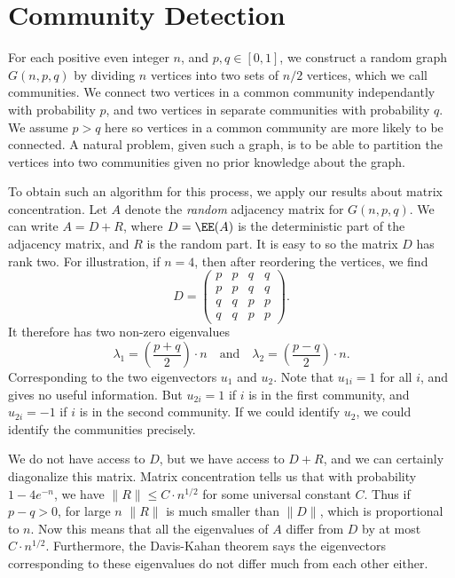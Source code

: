 \section{Community Detection}

For each positive even integer $n$, and $p,q \in [0,1]$, we construct a random graph $G(n,p,q)$ by dividing $n$ vertices into two sets of $n/2$ vertices, which we call communities. We connect two vertices in a common community independantly with probability $p$, and two vertices in separate communities with probability $q$. We assume $p > q$ here so vertices in a common community are more likely to be connected. A natural problem, given such a graph, is to be able to partition the vertices into two communities given no prior knowledge about the graph.

To obtain such an algorithm for this process, we apply our results about matrix concentration. Let $A$ denote the {\it random} adjacency matrix for $G(n,p,q)$. We can write $A = D + R$, where $D = \EE(A)$ is the deterministic part of the adjacency matrix, and $R$ is the random part. It is easy to so the matrix $D$ has rank two. For illustration, if $n = 4$, then after reordering the vertices, we find
%
\[ D = \begin{pmatrix} p & p & q & q \\ p & p & q & q \\ q & q & p & p \\ q & q & p & p \end{pmatrix}. \]
%
It therefore has two non-zero eigenvalues
%
\[ \lambda_1 = \left( \frac{p + q}{2} \right) \cdot n\quad\text{and}\quad \lambda_2 = \left( \frac{p - q}{2} \right) \cdot n. \]
%
Corresponding to the two eigenvectors $u_1$ and $u_2$. Note that $u_{1i} = 1$ for all $i$, and gives no useful information. But $u_{2i} = 1$ if $i$ is in the first community, and $u_{2i} = -1$ if $i$ is in the second community. If we could identify $u_2$, we could identify the communities precisely.

We do not have access to $D$, but we have access to $D + R$, and we can certainly diagonalize this matrix. Matrix concentration tells us that with probability $1 - 4e^{-n}$, we have $\| R \| \leq C \cdot n^{1/2}$ for some universal constant $C$. Thus if $p - q > 0$, for large $n$ $\| R \|$ is much smaller than $\| D \|$, which is proportional to $n$. Now this means that all the eigenvalues of $A$ differ from $D$ by at most $C \cdot n^{1/2}$. Furthermore, the Davis-Kahan theorem says the eigenvectors corresponding to these eigenvalues do not differ much from each other either.

